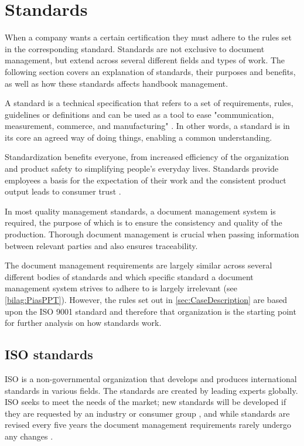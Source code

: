 \section{Standards} \label{sec:standards}
When a company wants a certain certification they must adhere to the rules set in the corresponding standard.
Standards are not exclusive to document management, but extend across several different fields and types of work.
The following section covers an explanation of standards, their purposes and benefits, as well as how these standards affects handbook management.

A standard is a technical specification that refers to a set of requirements, rules, guidelines or definitions \citep[p.~5]{Standard} and can be used as a tool to ease "communication, measurement, commerce, and manufacturing" \cite{Standardtool}.
In other words, a standard is in its core an agreed way of doing things, enabling a common understanding.

Standardization benefits everyone, from increased efficiency of the organization and product safety to simplifying people's everyday lives.
Standards provide employees a basis for the expectation of their work and the consistent product output leads to consumer trust \citep[p.~83]{Standardization}.

In most quality management standards, a document management system is required, the purpose of which is to ensure the consistency and quality of the production.
Thorough document management is crucial when passing information between relevant parties and also ensures traceability.

The document management requirements are largely similar across several different bodies of standards and which specific standard a document management system strives to adhere to is largely irrelevant (see \cref{bilag:PiasPPT}).
However, the rules set out in \cref{sec:CaseDescription} are based upon the ISO 9001 standard and therefore that organization is the starting point for further analysis on how standards work.

\subsection{ISO standards} \label{sec:ISOstandards}
ISO is a non-governmental organization that develops and produces international standards in various fields.
The standards are created by leading experts globally. \cite{ISOinfo}
ISO seeks to meet the needs of the market; new standards will be developed if they are requested by an industry or consumer group \cite{ISOdeveloping}, and while standards are revised every five years the document management requirements rarely undergo any changes \cite{ISOreviewedevery5years}.

